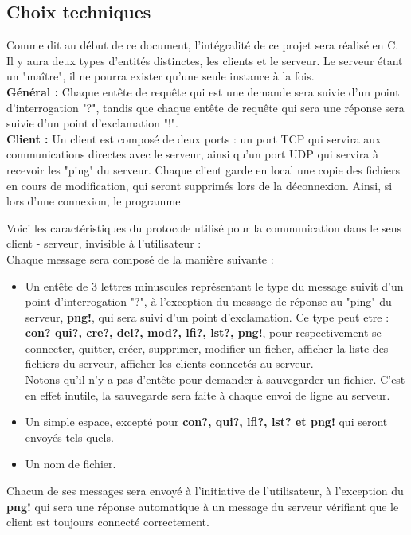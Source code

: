 \documentclass[14pt]{article}
\begin{document}
\subsection{Choix techniques}
Comme dit au début de ce document, l'intégralité de ce projet sera réalisé en C. Il y aura deux types d'entités distinctes, les clients et le serveur. Le serveur étant un "maître", il ne pourra exister qu'une seule instance à la fois.\\

\textbf{Général :}
Chaque entête de requête qui est une demande sera suivie d'un point d'interrogation "?", tandis que chaque entête de requête qui sera une réponse sera suivie d'un point d'exclamation "!".\\

\textbf{Client :}
Un client est composé de deux ports : un port TCP qui servira aux communications directes avec le serveur, ainsi qu'un port UDP qui servira à recevoir les "ping" du serveur. Chaque client garde en local une copie des fichiers en cours de modification, qui seront supprimés lors de la déconnexion. Ainsi, si lors d'une connexion, le programme

Voici les caractéristiques du protocole utilisé pour la communication dans le sens client - serveur, invisible à l'utilisateur :\\

Chaque message sera composé de la manière suivante :
\begin{itemize}
\item Un entête de 3 lettres minuscules représentant le type du message suivit d'un point d'interrogation "?", à l'exception du message de réponse au "ping" du serveur, \textbf{png!}, qui sera suivi d'un point d'exclamation. Ce type peut etre : \textbf{con? qui?, cre?, del?, mod?, lfi?, lst?, png!}, pour respectivement se connecter, quitter, créer, supprimer, modifier un ficher, afficher la liste des fichiers du serveur, afficher les clients connectés au serveur.\\
Notons qu'il n'y a pas d'entête pour demander à sauvegarder un fichier. C'est en effet inutile, la sauvegarde sera faite à chaque envoi de ligne au serveur.
\item Un simple espace, excepté pour \textbf{con?, qui?, lfi?, lst? et png!} qui seront envoyés tels quels.
\item Un nom de fichier.\\
\end{itemize}
Chacun de ses messages sera envoyé à l'initiative de l'utilisateur, à l'exception du \textbf{png!} qui sera une réponse automatique à un message du serveur vérifiant que le client est toujours connecté correctement.\\
\end{document}
